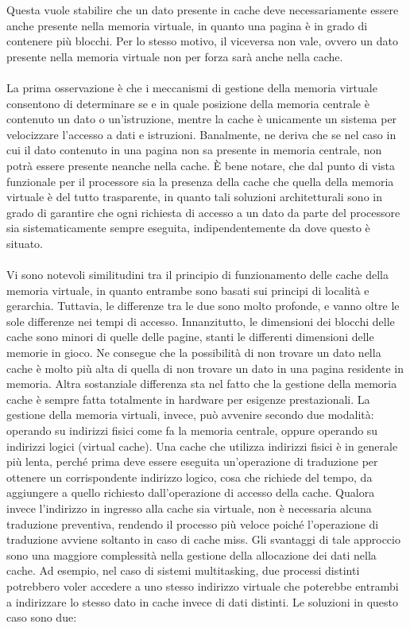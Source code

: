 Questa vuole stabilire che un dato presente in cache deve necessariamente essere anche presente nella memoria virtuale, in quanto una pagina è in grado di contenere più blocchi. Per lo stesso motivo, il viceversa non vale, ovvero un dato presente nella memoria virtuale non per forza sarà anche nella cache. 
\\
\\
La prima osservazione è che i meccanismi di gestione della memoria virtuale consentono di determinare se e in quale posizione della memoria centrale è contenuto un dato o un'istruzione, mentre la cache è unicamente un sistema per velocizzare l'accesso a dati e istruzioni. Banalmente, ne deriva che se nel caso in cui il dato contenuto in una pagina non sa presente in memoria centrale, non potrà essere presente neanche nella cache. \MakeUppercase{è} bene notare, che dal punto di vista funzionale per il processore sia la presenza della cache che quella della memoria virtuale è del tutto trasparente, in quanto tali soluzioni architetturali sono in grado di garantire che ogni richiesta di accesso a un dato da parte del processore sia sistematicamente sempre eseguita, indipendentemente da dove questo è situato.
\\
\\
Vi sono notevoli similitudini tra il principio di funzionamento delle cache della memoria virtuale, in quanto entrambe sono basati sui principi di località e gerarchia. Tuttavia, le differenze tra le due sono molto profonde, e vanno oltre le sole differenze nei tempi di accesso. Innanzitutto, le dimensioni dei blocchi delle cache sono minori di quelle delle pagine, stanti le differenti dimensioni delle memorie in gioco. Ne consegue che la possibilità di non trovare un dato nella cache è molto più alta di quella di non trovare un dato in una pagina residente in memoria. Altra sostanziale differenza sta nel fatto che la gestione della memoria cache è sempre fatta totalmente in hardware per esigenze prestazionali. La gestione della memoria virtuali, invece, può avvenire secondo due modalità: operando su indirizzi fisici come fa la memoria centrale, oppure operando su indirizzi logici (virtual cache). Una cache che utilizza indirizzi fisici è in generale più lenta, perché prima deve essere eseguita un'operazione di traduzione per ottenere un corrispondente indirizzo logico, cosa che richiede del tempo, da aggiungere a quello richiesto dall'operazione di accesso della cache. Qualora invece l'indirizzo in ingresso alla cache sia virtuale, non è necessaria alcuna traduzione preventiva, rendendo il processo più veloce poiché l'operazione di traduzione avviene soltanto in caso di cache miss. Gli svantaggi di tale approccio sono una maggiore complessità nella gestione della allocazione dei dati nella cache. Ad esempio, nel caso di sistemi multitasking, due processi distinti potrebbero voler accedere a uno stesso indirizzo virtuale che poterebbe entrambi a indirizzare lo stesso dato in cache invece di dati distinti. Le soluzioni in questo caso sono due:
